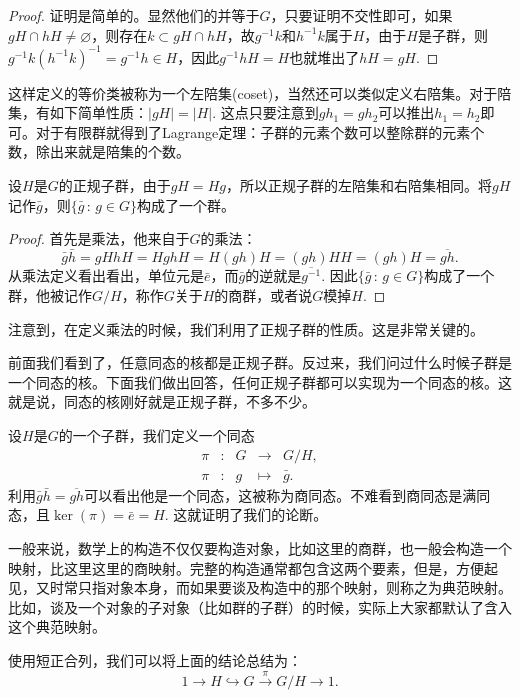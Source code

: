 \begin{proof}
	证明是简单的。显然他们的并等于$G$，只要证明不交性即可，如果$gH\cap hH\neq \varnothing$，则存在$k\subset gH\cap hH$，故$g^{-1}k$和$h^{-1}k$属于$H$，由于$H$是子群，则$g^{-1}k\left(h^{-1}k\right)^{-1}=g^{-1}h\in H$，因此$g^{-1}hH=H$也就堆出了$hH=gH$.
\end{proof}

这样定义的等价类被称为一个左陪集(coset)，当然还可以类似定义右陪集。对于陪集，有如下简单性质：$|gH|=|H|$. 这点只要注意到$gh_1=gh_2$可以推出$h_1=h_2$即可。对于有限群就得到了Lagrange定理：子群的元素个数可以整除群的元素个数，除出来就是陪集的个数。

\begin{pro}
	设$H$是$G$的正规子群，由于$gH=Hg$，所以正规子群的左陪集和右陪集相同。将$gH$记作$\bar{g}$，则$\{\bar{g}\,:\, g\in G\}$构成了一个群。
\end{pro}

\begin{proof}
首先是乘法，他来自于$G$的乘法：
\[
	\bar{g}\bar{h}=gHhH=HghH=H(gh)H=(gh)HH=(gh)H=\overline{gh}.
\]
从乘法定义看出看出，单位元是$\bar{e}$，而$\bar{g}$的逆就是$\overline{g^{-1}}$. 因此$\{\bar{g}\,:\, g\in G\}$构成了一个群，他被记作$G/H$，称作$G$关于$H$的商群，或者说$G$模掉$H$.
\end{proof}

注意到，在定义乘法的时候，我们利用了正规子群的性质。这是非常关键的。

\para[商群] 前面我们看到了，任意同态的核都是正规子群。反过来，我们问过什么时候子群是一个同态的核。下面我们做出回答，任何正规子群都可以实现为一个同态的核。这就是说，同态的核刚好就是正规子群，不多不少。

设$H$是$G$的一个子群，我们定义一个同态
\[
	\begin{array}{ccccc}
		\pi &:&G &\to& G/H,\\
		\pi &:&g &\mapsto& \bar{g}.
	\end{array}
\]
利用$\bar{g}\bar{h}=\overline{gh}$可以看出他是一个同态，这被称为商同态。不难看到商同态是满同态，且$\ker(\pi)=\bar{e}=H$. 这就证明了我们的论断。

一般来说，数学上的构造不仅仅要构造对象，比如这里的商群，也一般会构造一个映射，比这里这里的商映射。完整的构造通常都包含这两个要素，但是，方便起见，又时常只指对象本身，而如果要谈及构造中的那个映射，则称之为典范映射。比如，谈及一个对象的子对象（比如群的子群）的时候，实际上大家都默认了含入这个典范映射。
\endpara

使用短正合列，我们可以将上面的结论总结为：
\[
	1\to H \hookrightarrow G \xrightarrow{\pi} G/H\to 1.
\]


